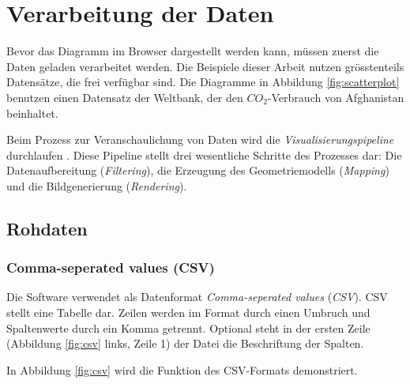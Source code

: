 \section{Verarbeitung der Daten}

Bevor das Diagramm im Browser dargestellt werden kann, müssen zuerst die Daten geladen verarbeitet werden. Die Beispiele dieser Arbeit nutzen grösstenteils Datensätze, die frei verfügbar sind.  %
Die Diagramme in Abbildung \ref{fig:scatterplot} benutzen einen Datensatz der Weltbank, der den $CO_2$-Verbrauch von Afghanistan beinhaltet.

Beim Prozess zur Veranschaulichung von Daten wird die \textit{Visualisierungspipeline} durchlaufen \cite{pipeline}. Diese Pipeline stellt drei wesentliche Schritte des Prozesses dar: Die Datenaufbereitung (\textit{Filtering}), die Erzeugung des Geometriemodells (\textit{Mapping}) und die Bildgenerierung (\textit{Rendering}).


\subsection{Rohdaten}

\subsubsection{Comma-seperated values (CSV)}

Die Software verwendet als Datenformat \textit{Comma-seperated values} (\textit{CSV}). CSV stellt eine Tabelle dar. Zeilen werden im Format durch einen Umbruch und Spaltenwerte durch ein Komma getrennt. Optional steht in der ersten Zeile (Abbildung \ref{fig:csv} links, Zeile 1) der Datei die Beschriftung der Spalten.

In Abbildung \ref{fig:csv} wird die Funktion des CSV-Formats demonstriert.

